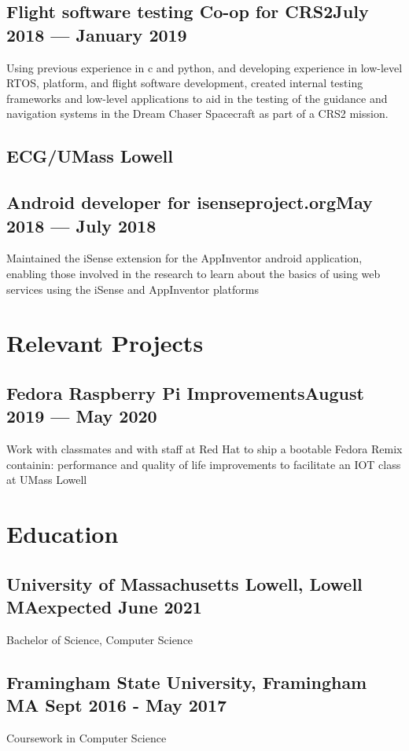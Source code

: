 \documentclass[11pt]{article}
\begin{document}
\subsection{Flight software testing Co-op for CRS2\dotfill July 2018 --- January 2019}
Using previous experience in c and python, and developing experience in low-level
RTOS, platform, and flight software development,
created internal testing frameworks and 
low-level applications to aid in the testing of the
guidance and navigation systems in the Dream Chaser
Spacecraft as part of a CRS2 mission.

\subsection{ECG/UMass Lowell}
\subsection{Android developer for isenseproject.org\dotfill May 2018 --- July 2018}
Maintained the iSense
extension for the AppInventor android application, 
enabling those involved in the research to learn
about the basics of using web services using the iSense
and AppInventor platforms

\section{Relevant Projects}

\subsection{Fedora Raspberry Pi Improvements\dotfill August 2019 --- May 2020 }

Work with classmates
and with staff at Red Hat
to ship a bootable Fedora Remix containin: performance and quality of life improvements
to facilitate an IOT class at UMass Lowell

\section{Education}

\subsection{University of Massachusetts Lowell, Lowell MA\dotfill expected June 2021}
{\hspace{-1em} Bachelor of Science, Computer Science}

\subsection{Framingham State University, Framingham MA
\dotfill Sept 2016 - May 2017} 
{\hspace{-1em}Coursework in Computer Science}
\end{document}
